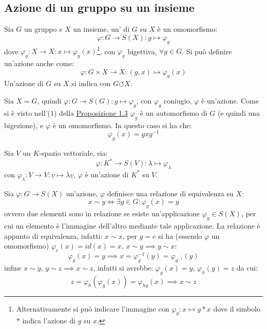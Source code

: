 \documentclass[11pt]{scrartcl}
\begin{document}
\newpage
\subsection{Azione di un gruppo su un insieme}

\begin{definition}
    Sia $G$ un gruppo e $X$ un insieme, un' di $G$ su $X$ è un omomorfismo:
        \[ \varphi : G \longrightarrow S(X) : g \longmapsto \varphi_g 
            \]
    dove $\varphi_g : X \longrightarrow X : x \longmapsto \varphi_g(x)$\footnote{Alternativamente si può indicare l'immagine con $\varphi_g : x \longmapsto g \ast x$ dove il simbolo $\ast$ indica l'azione di $g$ su $x$.},
     con $\varphi_g$ bigettiva, $\forall g \in G$. Si può definire un'azione anche come:
        \[ \varphi : G \times X \longrightarrow X : (g,x) \longmapsto \varphi_g(x)
            \]
    Un'azione di $G$ su $X$ si indica con $G \circlearrowleft X$.
\end{definition}

\begin{example}
    Sia $X = G$, quindi $\varphi : G \longrightarrow S(G) : g \longmapsto \varphi_g$, con $\varphi_g$ coniugio, $\varphi$ è un'azione. Come si è visto nell'($1$)
    della \hyperref[prop1]{Proposizione 1.3} $\varphi_g$ è un automorfismo di $G$ (e quindi una bigezione), e $\varphi$ è un omomorfismo. In questo caso si ha che:
        \[ \varphi_g(x) = gxg^{-1}
            \]
\end{example}

\begin{example}
    Sia $V$ un $K$-spazio vettoriale, sia:
        \[ \varphi : K^* \longrightarrow S(V) : \lambda \longmapsto \varphi_\lambda
            \]
    con $\varphi_\lambda : V \longrightarrow V : \underline v \longmapsto \lambda \underline v$, $\varphi$ è un'azione di $K^*$ su $V$.
\end{example}

Sia $\varphi: G \longrightarrow S(X)$ un'azione, $\varphi$ definisce una relazione di equivalenza su $X$:
    \[ x \sim y \iff \exists g \in G : \varphi_g(x) = y
        \]
    ovvero due elementi sono in relazione se esiste un'applicazione $\varphi_g \in S(X)$, per cui un elemento è l'immagine dell'altro mediante 
    tale applicazione. La relazione è appunto di equivalenza, infatti: $x \sim x$, per $g = e$ si ha (essendo $\varphi$ un omomorfismo) $\varphi_e(x) = id(x) = x$, 
    $x \sim y \implies y \sim x$:
        \[ \varphi_g(x) = y \implies x = \varphi_g^{-1}(y) = \varphi_{g^{-1}}(y)
            \]
    infine $x \sim y$, $y \sim z \implies x \sim z$, infatti si avrebbe: $\varphi_g(x) = y$, $\varphi_h(y) = z$ da cui:
        \[ z = \varphi_h(\varphi_g(x)) = \varphi_{hg}(x) \implies x \sim z
            \]
\end{document}
